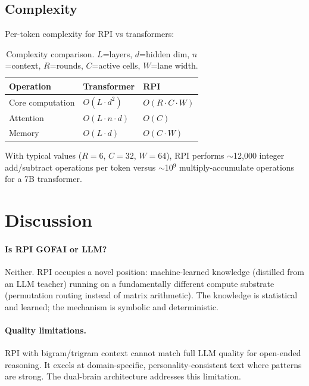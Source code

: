 \documentclass[10pt,twocolumn]{article}
\begin{document}
\subsection{Complexity}

Per-token complexity for RPI vs transformers:

\begin{table}[h]
\centering
\small
\begin{tabular}{lll}
\toprule
\textbf{Operation} & \textbf{Transformer} & \textbf{RPI} \\
\midrule
Core computation & $O(L \cdot d^2)$ & $O(R \cdot C \cdot W)$ \\
Attention & $O(L \cdot n \cdot d)$ & $O(C)$ \\
Memory & $O(L \cdot d)$ & $O(C \cdot W)$ \\
\bottomrule
\end{tabular}
\caption{Complexity comparison. $L$=layers, $d$=hidden dim, $n$=context, $R$=rounds, $C$=active cells, $W$=lane width.}
\label{tab:complexity}
\end{table}

With typical values ($R=6$, $C=32$, $W=64$), RPI performs $\sim$12,000 integer add/subtract operations per token versus $\sim$10$^9$ multiply-accumulate operations for a 7B transformer.

\section{Discussion}
\label{sec:discussion}

\paragraph{Is RPI GOFAI or LLM?} Neither. RPI occupies a novel position: machine-learned knowledge (distilled from an LLM teacher) running on a fundamentally different compute substrate (permutation routing instead of matrix arithmetic). The knowledge is statistical and learned; the mechanism is symbolic and deterministic.

\paragraph{Quality limitations.} RPI with bigram/trigram context cannot match full LLM quality for open-ended reasoning. It excels at domain-specific, personality-consistent text where patterns are strong. The dual-brain architecture addresses this limitation.
\end{document}
